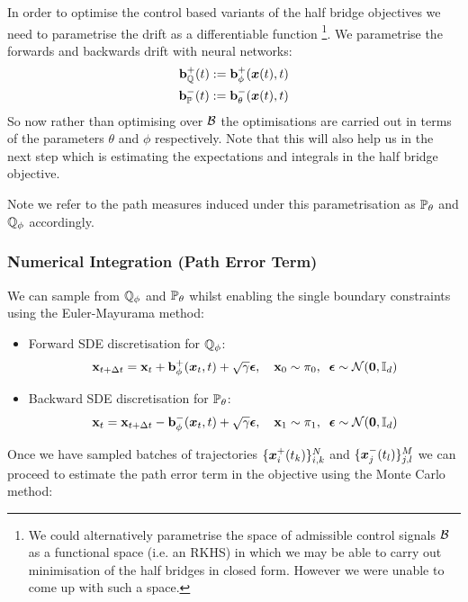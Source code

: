 \documentclass[a4paper,12pt,twoside,openright]{report}
\theoremstyle{definition}
\begin{document}
In order to optimise the control based variants of the half bridge objectives we need to parametrise the drift as a differentiable function \footnote{We could alternatively parametrise the space of admissible control signals $\calB$ as a functional space (i.e. an  RKHS) in which we may be able to carry out minimisation of the half bridges in closed form. However we were unable to come up with such a space.}. We parametrise the forwards and backwards drift with neural networks:
\begin{align}
    \rvb^{+}_{\Q}(t) := \rvb^{+}_{\phi}(\vx(t), t) \nonumber \\
    \rvb^{-}_{\P}(t) := \rvb^{-}_{\theta}(\vx(t), t)
\end{align}
So now rather than optimising over $\calB$ the optimisations are carried out in terms of the parameters $\theta$ and $\phi$ respectively. Note that this will also help us in the next step which is estimating the expectations and integrals in the half bridge objective.

Note we refer to the path measures induced under this parametrisation as $\P_{\theta}$ and $\Q_{\phi}$ accordingly.

\subsubsection{Numerical Integration (Path Error Term)}
We can sample from $\Q_{\phi}$ and $\P_{\theta}$ whilst enabling the single boundary constraints using the Euler-Mayurama method:
\begin{itemize}
    \item  Forward SDE discretisation for $\Q_{\phi}$:
\begin{align*}
    \rvx_{t + \Delta t} = \rvx_t + \rvb^{+}_{\phi}(\vx_t, t) + \sqrt{\gamma} \rvepsilon, \quad \rvx_0 \sim \pi_0, \;\;\rvepsilon \sim \calN(\vzero, \I) 
\end{align*}
    \item  Backward SDE discretisation for $\P_{\theta}$:
\begin{align*}
    \rvx_{t} = \rvx_{t+\Delta t} - \rvb^{-}_{\phi}(\vx_t, t) + \sqrt{\gamma} \rvepsilon, \quad \rvx_1 \sim \pi_1,\;\; \rvepsilon \sim \calN(\vzero, \I)
\end{align*}
\end{itemize}

Once we have sampled batches of trajectories $\{\vx^{+}_i(t_k)\}_{i,k}^N$ and $\{\vx^{-}_j(t_l)\}_{j,l}^M$ we can proceed to estimate the path error term in the objective using the Monte Carlo  method:
\end{document}
